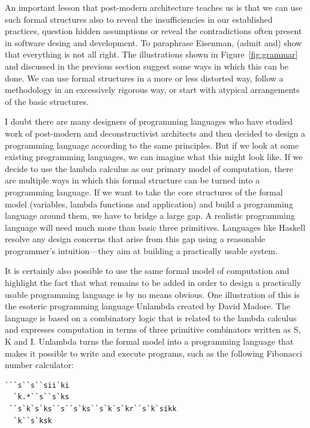 An important lesson that post-modern architecture teaches us is that we can use such formal
structures also to reveal the insufficiencies in our established practices, question hidden
assumptions or reveal the contradictions often present in software desing and development.
To paraphrase Eisenman, (admit and) show that everything is not all right. The illustrations
shown in Figure~\ref{fig:grammar} and discussed in the previous section suggest some ways
in which this can be done. We can use formal structures in a more or less distorted way,
follow a methodology in an excessively rigorous way, or start with atypical arrangements
of the basic structures.

I doubt there are many designers of programming languages who have studied work of post-modern
and deconstructivist architects and then decided to design a programming language according to
the same principles. But if we look at some existing programming languages, we can imagine what
this might look like. If we decide to use the lambda calculus as our primary model of computation,
there are multiple ways in which this formal structure can be turned into a programming language.
If we want to take the core structures of the formal model (variables, lambda functions and
application) and build a programming language around them, we have to bridge a large gap.
A realistic programming language will need much more than basic three primitives. Languages like
Haskell resolve any design concerns that arise from this gap using a reasonable programmer's
intuition---they aim at building a practically usable system.

It is certainly also possible to use the same formal model of computation and highlight the fact
that what remains to be added in order to design a practically usable programming language is by
no means obvious. One illustration of this is the esoteric programming language
Unlambda created by David Madore. The language is based on a
combinatory logic that is related to the lambda calculus and expresses computation in terms
of three primitive combinators written as S, K and I. Unlambda turns the formal model into a
programming language that makes it possible to write and execute programs, such as the following
Fibonacci number calculator:

\begin{lstlisting}
```s``s``sii`ki
  `k.*``s``s`ks
 ``s`k`s`ks``s``s`ks``s`k`s`kr``s`k`sikk
  `k``s`ksk
\end{lstlisting}

